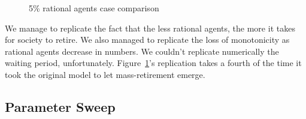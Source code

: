\documentclass[runningheads,a4paper]{article}
\begin{document}
\begin{figure}
\centering

\caption{5\% rational agents case comparison}
\label{figure5}
\end{figure}

We manage to replicate the fact that the less rational agents, the more it takes for society to retire.
We also managed to replicate the loss of monotonicity as rational agents decrease in numbers.
We couldn't replicate numerically the waiting period, unfortunately.
Figure~\ref{figure5}'s replication takes a fourth of the time it took the original model to let mass-retirement emerge.



\subsection{Parameter Sweep}
\end{document}
